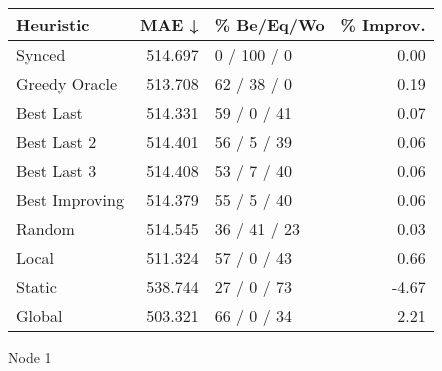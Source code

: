 \begin{tabular}{lrlr}
\toprule
\textbf{Heuristic} & \textbf{MAE ↓} & \textbf{\% Be/Eq/Wo} & \textbf{\% Improv.} \\
\midrule
            Synced &        514.697 &          0 / 100 / 0 &                0.00 \\
     Greedy Oracle &        513.708 &          62 / 38 / 0 &                0.19 \\
         Best Last &        514.331 &          59 / 0 / 41 &                0.07 \\
       Best Last 2 &        514.401 &          56 / 5 / 39 &                0.06 \\
       Best Last 3 &        514.408 &          53 / 7 / 40 &                0.06 \\
    Best Improving &        514.379 &          55 / 5 / 40 &                0.06 \\
            Random &        514.545 &         36 / 41 / 23 &                0.03 \\
             Local &        511.324 &          57 / 0 / 43 &                0.66 \\
            Static &        538.744 &          27 / 0 / 73 &               -4.67 \\
            Global &        503.321 &          66 / 0 / 34 &                2.21 \\
\bottomrule
\end{tabular}
\caption{Node 1}
\label{tab:iid_lr01_le1_bs2_1}
